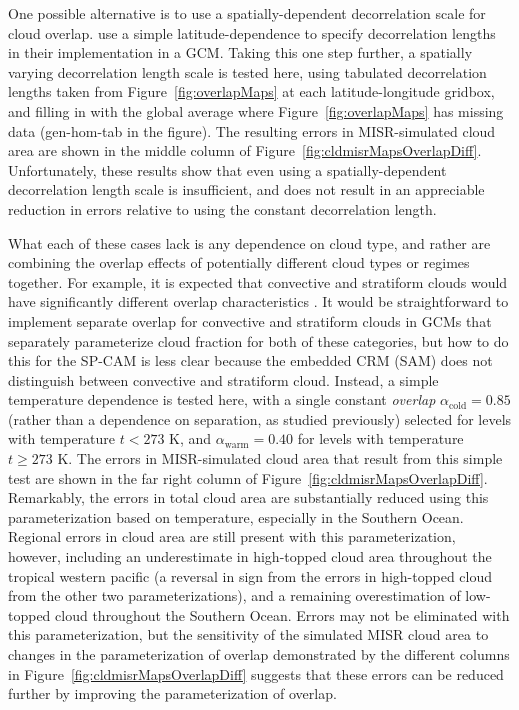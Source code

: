 One possible alternative is to use a spatially-dependent decorrelation
scale for cloud overlap. \citep{oreopoulos_et_al_2012} use a simple
latitude-dependence to specify decorrelation lengths in their
implementation in a GCM. Taking this one step further, a spatially
varying decorrelation length scale is tested here, using tabulated
decorrelation lengths taken from Figure~\ref{fig:overlapMaps} at each
latitude-longitude gridbox, and filling in with the global average where
Figure~\ref{fig:overlapMaps} has missing data (gen-hom-tab in the
figure). The resulting errors in MISR-simulated cloud area are shown in
the middle column of Figure~\ref{fig:cldmisrMapsOverlapDiff}.
Unfortunately, these results show that even using a spatially-dependent
decorrelation length scale is insufficient, and does not result in an
appreciable reduction in errors relative to using the constant
decorrelation length.

What each of these cases lack is any dependence on cloud type, and
rather are combining the overlap effects of potentially different cloud
types or regimes together. For example, it is expected that convective
and stratiform clouds would have significantly different overlap
characteristics \citep[e.g.,][]{pincus_et_al_2005}. It would be
straightforward to implement separate overlap for convective and
stratiform clouds in GCMs that separately parameterize cloud fraction
for both of these categories, but how to do this for the SP-CAM is less
clear because the embedded CRM (SAM) does not distinguish between
convective and stratiform cloud. Instead, a simple temperature
dependence is tested here, with a single constant \emph{overlap}
\(\alpha_\textrm{cold} = 0.85\) (rather than a dependence on separation,
as studied previously) selected for levels with temperature \(t < 273\)
K, and \(\alpha_\textrm{warm} = 0.40\) for levels with temperature
\(t \ge 273\) K. The errors in MISR-simulated cloud area that result
from this simple test are shown in the far right column of
Figure~\ref{fig:cldmisrMapsOverlapDiff}. Remarkably, the errors in total
cloud area are substantially reduced using this parameterization based
on temperature, especially in the Southern Ocean. Regional errors in
cloud area are still present with this parameterization, however,
including an underestimate in high-topped cloud area throughout the
tropical western pacific (a reversal in sign from the errors in
high-topped cloud from the other two parameterizations), and a remaining
overestimation of low-topped cloud throughout the Southern Ocean. Errors
may not be eliminated with this parameterization, but the sensitivity of
the simulated MISR cloud area to changes in the parameterization of
overlap demonstrated by the different columns in
Figure~\ref{fig:cldmisrMapsOverlapDiff} suggests that these errors can
be reduced further by improving the parameterization of overlap.

